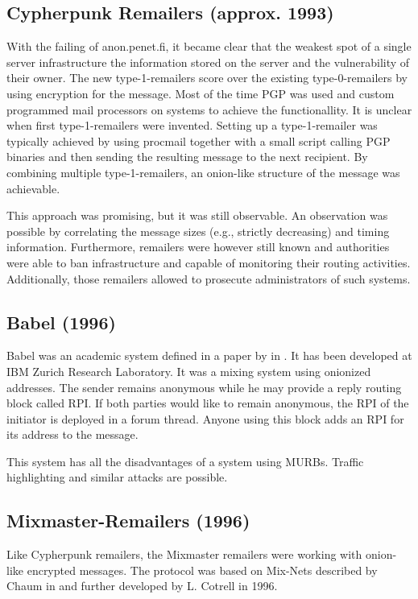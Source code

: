 \subsection{Cypherpunk Remailers (approx. 1993)\label{sec:remCypherpunk}}
With the failing of anon.penet.fi, it became clear that the weakest spot of a single server infrastructure the information stored on the server and the vulnerability of their owner. The new type-1-remailers score over the existing type-0-remailers by using encryption for the message. Most of the time PGP was used and custom programmed mail processors on systems to achieve the functionallity. It is unclear when first type-1-remailers were invented. Setting up a type-1-remailer was typically achieved by using procmail together with a small script calling PGP binaries and then sending the resulting message to the next recipient. By combining multiple type-1-remailers, an onion-like structure of the message was achievable. 

This approach was promising, but it was still observable. An observation was possible by correlating the message sizes (e.g., strictly decreasing) and timing information. Furthermore, remailers were however still known and authorities were able to ban infrastructure and capable of monitoring their routing activities. Additionally, those remailers allowed to prosecute administrators of such systems.

\subsection{Babel (1996)}
Babel was an academic system defined in a paper by \citeauthor{babel} in \citeyear{babel}\cite{babel}. It has been developed at IBM Zurich Research Laboratory. It was a mixing system using onionized addresses. The sender remains anonymous while he may provide a reply routing block called RPI. If both parties would like to remain anonymous, the RPI of the initiator is deployed in a forum thread. Anyone using this block adds an RPI for its address to the message.

This system has all the disadvantages of a system using MURBs. Traffic highlighting and similar attacks are possible.

\subsection{Mixmaster-Remailers (1996)\label{sec:remMixmaster}}
Like Cypherpunk remailers, the Mixmaster remailers were working with onion-like encrypted messages. The protocol was based on Mix-Nets described by Chaum in \cite{CHAUM1} and further developed by L. Cotrell in 1996. 

